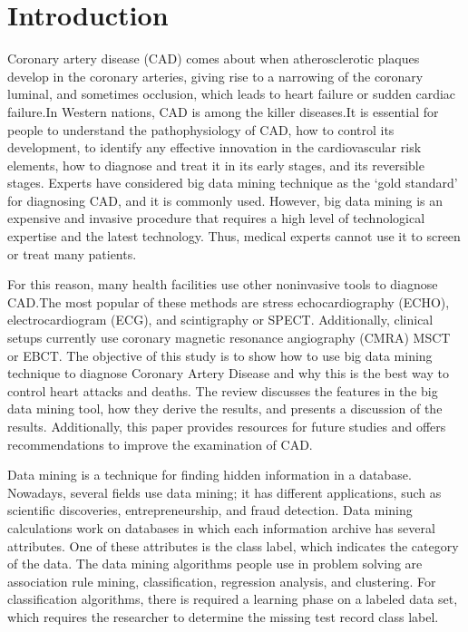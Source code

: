 \documentclass[sigconf]{acmart}
\begin{document}
\section{Introduction}
Coronary artery disease (CAD) comes about when atherosclerotic plaques develop in the coronary arteries, giving rise to a narrowing of the coronary luminal, and sometimes occlusion, which leads to heart failure or sudden cardiac failure.In Western nations, CAD is among the killer diseases.It is essential for people to understand the pathophysiology of CAD, how to control its development, to identify any effective innovation in the cardiovascular risk elements, how to diagnose and treat it in its early stages, and its reversible stages.
Experts have considered big data mining technique as the `gold standard' for diagnosing CAD, and it is commonly used.
However, big data mining is an expensive and invasive procedure that requires a high level of technological expertise and the latest technology. Thus, medical experts cannot use it to screen or treat many patients.
\par For this reason, many health facilities use other noninvasive tools to diagnose CAD.The most popular of these methods are stress echocardiography (ECHO), electrocardiogram (ECG), and scintigraphy or SPECT. Additionally, clinical setups currently use coronary magnetic resonance angiography (CMRA) MSCT or EBCT.
The objective of this study is to show how to use big data mining technique to diagnose Coronary Artery Disease and why this is the best way to control heart attacks and deaths.
The review discusses the features in the big data mining tool, how they derive the results, and presents a discussion of the results.
Additionally, this paper provides resources for future studies and offers recommendations to improve the examination of CAD.
\par Data mining is a technique for finding hidden information in a database.
Nowadays, several fields use data mining; it has different applications, such as scientific discoveries, entrepreneurship, and fraud detection.
Data mining calculations work on databases in which each information archive has several attributes.
 One of these attributes is the class label, which indicates the category of the data.
The data mining algorithms people use in problem solving are association rule mining, classification, regression analysis, and clustering.
For classification algorithms, there is required a learning phase on a labeled data set, which requires the researcher to determine the missing test record class label.
\end{document}
